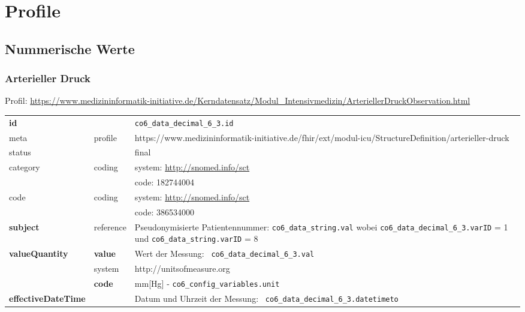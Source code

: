 \section{Profile} \label{sec:profil}

\subsection{Nummerische Werte}

\subsubsection{Arterieller Druck} 

Profil: \url{https://www.medizininformatik-initiative.de/Kerndatensatz/Modul_Intensivmedizin/ArteriellerDruckObservation.html}

\begin{longtable}{|l|l|p{7.5cm}|}
        \hline
        \rowcolor{lightgray} \multicolumn{3}{|l|}{Data Mapping (inhaltlich)} \\ \hline
        \textbf{id} &  & \texttt{co6\_data\_decimal\_6\_3.id} \\ \hline
	meta & profile & https://www.medizininformatik-initiative.de/fhir/ext/modul-icu/StructureDefinition/arterieller-druck \\ \hline 
	status &  & final   \\ \hline 
	category & coding & system: \url{http://snomed.info/sct} \\
\cline{3-3}
	& & code: 182744004 \\ \hline
	code & coding & system: \url{http://snomed.info/sct} \\ 
	\cline{3-3} 
	 &  & code: 386534000 \\ \hline
	 \textbf{subject} & reference & Pseudonymisierte Patientennummer: \texttt{co6\_data\_string.val} wobei \texttt{co6\_data\_decimal\_6\_3.varID} = 1 und \texttt{co6\_data\_string.varID} = 8 \\ \hline
	 \textbf{valueQuantity}  & \textbf{value} & Wert der Messung: \texttt{
co6\_data\_decimal\_6\_3.val} \\
        \cline{2-3}
         & system & http://unitsofmeasure.org \\
         \cline{2-3}
         & \textbf{code} &
mm[Hg] - \texttt{co6\_config\_variables.unit}
\\ \hline
     \textbf{effectiveDateTime}  &  & Datum und Uhrzeit der Messung: \texttt{
co6\_data\_decimal\_6\_3.datetimeto} \\ \hline
\end{longtable}

